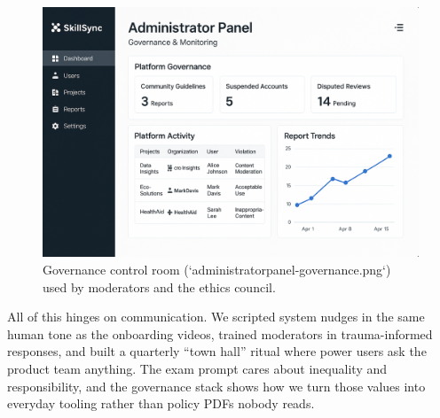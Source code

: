 \begin{figure}[h]
  \centering
  \includegraphics[width=0.85\linewidth]{figures/opgave05/administratorpanel-governance.png}
  \caption{Governance control room (`administratorpanel-governance.png`) used by moderators and the ethics council.}
  \label{fig:admin-panel}
\end{figure}

All of this hinges on communication. We scripted system nudges in the same human tone as the onboarding videos, trained moderators in trauma-informed responses, and built a quarterly ``town hall'' ritual where power users ask the product team anything. The exam prompt cares about inequality and responsibility, and the governance stack shows how we turn those values into everyday tooling rather than policy PDFs nobody reads.
